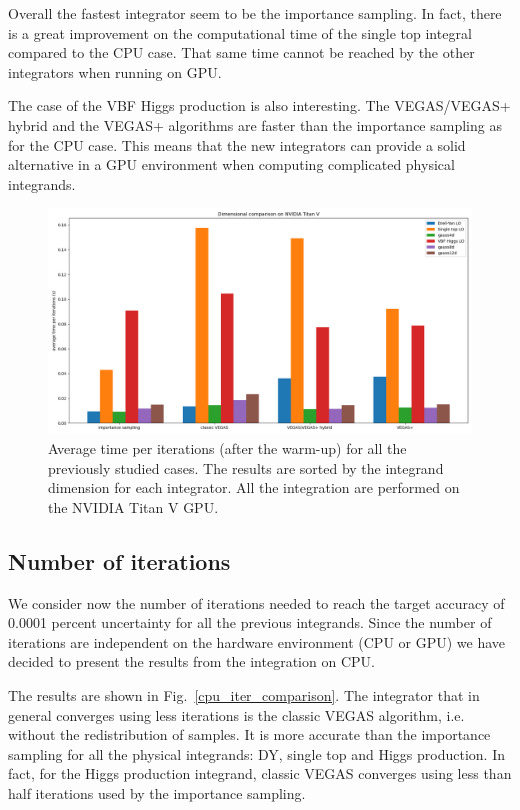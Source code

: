 \documentclass[../main/main.tex]{subfiles}
\begin{document}
Overall the fastest integrator seem to be the importance sampling. In fact, there is a great improvement on the computational time of the single top integral compared to the CPU case. That same time cannot be reached by the other integrators when running on GPU.

The case of the VBF Higgs production is also interesting. The VEGAS/VEGAS+ hybrid and the VEGAS+ algorithms are faster than the importance sampling as for the CPU case. This means that the new integrators can provide a solid alternative in a GPU environment when computing complicated physical integrands.

\begin{figure}[h]
	\centering
	\includegraphics[width=\textwidth]{../images/GPU_final.png}
	\caption{Average time per iterations (after the warm-up) for all the previously studied cases. The results are sorted by the integrand dimension for each integrator. All the integration are performed on the NVIDIA Titan V GPU. }
	\label{gpu_time_comparison}
\end{figure}


\subsection{Number of iterations}
We consider now the number of iterations needed to reach the target accuracy of 0.0001 percent uncertainty for all the previous integrands. Since the number of iterations are independent on the hardware environment (CPU or GPU) we have decided to present the results from the integration on CPU. 

The results are shown in Fig.~\ref{cpu_iter_comparison}. The integrator that in general converges
using less iterations is the classic VEGAS algorithm, i.e. without the redistribution of samples. It is more accurate than the importance sampling for all the physical integrands: DY, single top and Higgs production. In fact, for the Higgs production integrand, classic VEGAS converges using less than half iterations used by the importance sampling.
\end{document}
